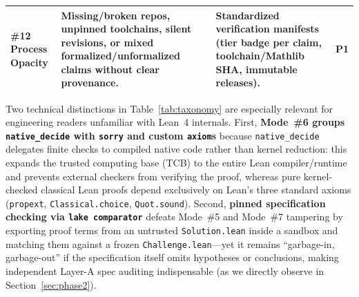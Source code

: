\documentclass[11pt,letterpaper]{article}
\begin{document}
\begin{table}[!tbp]
\begin{tabularx}{\textwidth}{@{}>{\raggedright\arraybackslash}p{2.35cm}>{\raggedright\arraybackslash}X>{\raggedright\arraybackslash}X>{\raggedright\arraybackslash}p{1.25cm}@{}}
\textbf{\#12 Process Opacity} & Missing/broken repos, unpinned toolchains, silent revisions, or mixed formalized/unformalized claims without clear provenance. & Standardized verification manifests (tier badge per claim, toolchain/Mathlib SHA, immutable releases). & \textbf{P1} \\
\bottomrule
\end{tabularx}
\end{table}

Two technical distinctions in Table~\ref{tab:taxonomy} are especially relevant for engineering readers unfamiliar with Lean~4 internals. First, \textbf{Mode~\#6 groups \texttt{native\_decide} with \texttt{sorry} and custom \texttt{axiom}s} because \texttt{native\_decide} delegates finite checks to compiled native code rather than kernel reduction: this expands the trusted computing base (TCB) to the entire Lean compiler/runtime and prevents external checkers from verifying the proof, whereas pure kernel-checked classical Lean proofs depend exclusively on Lean's three standard axioms (\texttt{propext}, \texttt{Classical.choice}, \texttt{Quot.sound}). Second, \textbf{pinned specification checking via \texttt{lake comparator}} defeats Mode~\#5 and Mode~\#7 tampering by exporting proof terms from an untrusted \texttt{Solution.lean} inside a sandbox and matching them against a frozen \texttt{Challenge.lean}---yet it remains ``garbage-in, garbage-out'' if the specification itself omits hypotheses or conclusions, making independent Layer-A spec auditing indispensable (as we directly observe in Section~\ref{sec:phase2}).
\end{document}
